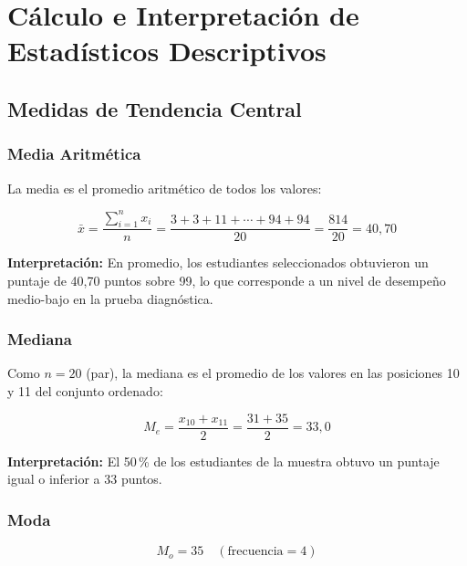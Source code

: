 \documentclass[12pt,a4paper]{article}
\begin{document}
\section{Cálculo e Interpretación de Estadísticos Descriptivos}

\subsection{Medidas de Tendencia Central}

\subsubsection{Media Aritmética}

La media es el promedio aritmético de todos los valores:

\begin{equation}
  \bar{x} = \frac{\sum_{i=1}^{n} x_i}{n}
           = \frac{3 + 3 + 11 + \cdots + 94 + 94}{20}
           = \frac{814}{20} = 40{,}70
\end{equation}

\textbf{Interpretación:} En promedio, los estudiantes seleccionados obtuvieron un puntaje de
40,70 puntos sobre 99, lo que corresponde a un nivel de desempeño medio-bajo en la prueba
diagnóstica.

\subsubsection{Mediana}

Como $n = 20$ (par), la mediana es el promedio de los valores en las posiciones 10 y 11 del
conjunto ordenado:

\begin{equation}
  M_e = \frac{x_{10} + x_{11}}{2} = \frac{31 + 35}{2} = 33{,}0
\end{equation}

\textbf{Interpretación:} El 50\,\% de los estudiantes de la muestra obtuvo un puntaje igual o
inferior a 33 puntos.

\subsubsection{Moda}

\begin{equation}
  M_o = 35 \quad (\text{frecuencia} = 4)
\end{equation}
\end{document}
